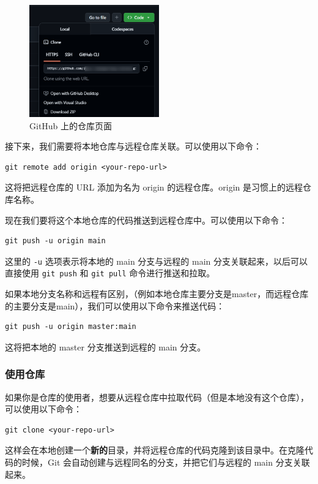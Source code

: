 \documentclass[../main.tex]{subfiles}
\begin{document}
\begin{figure}[htbp]
\centering
\includegraphics[width=0.5\textwidth]{images/example.png}
\caption{GitHub 上的仓库页面}
\label{fig:github-repo}
\end{figure}

接下来，我们需要将本地仓库与远程仓库关联。可以使用以下命令：
\begin{verbatim}
git remote add origin <your-repo-url>
\end{verbatim}
这将把远程仓库的 URL 添加为名为 origin 的远程仓库。origin 是习惯上的远程仓库名称。

现在我们要将这个本地仓库的代码推送到远程仓库中。可以使用以下命令：
\begin{verbatim}
git push -u origin main
\end{verbatim}
这里的 \texttt{-u} 选项表示将本地的 main 分支与远程的 main 分支关联起来，以后可以直接使用 \texttt{git push} 和 \texttt{git pull} 命令进行推送和拉取。

如果本地分支名称和远程有区别，（例如本地仓库主要分支是master，而远程仓库的主要分支是main），我们可以使用以下命令来推送代码：
\begin{verbatim}
git push -u origin master:main
\end{verbatim}
这将把本地的 master 分支推送到远程的 main 分支。

\subsubsection{使用仓库}

如果你是仓库的使用者，想要从远程仓库中拉取代码（但是本地没有这个仓库），可以使用以下命令：

\begin{verbatim}
git clone <your-repo-url>
\end{verbatim}

这样会在本地创建一个\textbf{新的}目录，并将远程仓库的代码克隆到该目录中。在克隆代码的时候，Git 会自动创建与远程同名的分支，并把它们与远程的 main 分支关联起来。
\end{document}
